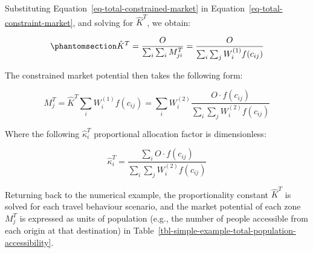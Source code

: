 \documentclass[
]{article}
\begin{document}
Substituting Equation~\ref{eq-total-constrained-market} in
Equation~\ref{eq-total-constraint-market}, and solving for \(\hat K^T\),
we obtain:

\begin{equation}\phantomsection\label{eq-total-population-balancing-factor}{
\hat K^T=\frac{O}{\sum_i\sum_i M^T_{ji}} = \frac{O}{\sum_i\sum_j W^{(1)}_i f(c_{ij})} 
}\end{equation}

The constrained market potential then takes the following form:

\[
M^T_j = \hat K^T\sum_i W^{(1)}_if(c_{ij}) = \sum_i W^{(2)}_i \frac{O \cdot f(c_{ij})}{\sum_i\sum_j W^{(2)}_if(c_{ij})}
\]

Where the following \(\hat \kappa_i^T\) proportional allocation factor
is dimensionless:

\[
\hat \kappa_i^T = \frac{\sum_i O \cdot f(c_{ij})}{\sum_i\sum_j W^{(2)}_if(c_{ij})}
\]

Returning back to the numerical example, the proportionality constant
\(\hat K^T\) is solved for each travel behaviour scenario, and the
market potential of each zone \(M^T_j\) is expressed as units of
population (e.g., the number of people accessible from each origin at
that destination) in
Table~\ref{tbl-simple-example-total-population-accessibility}.
\end{document}

